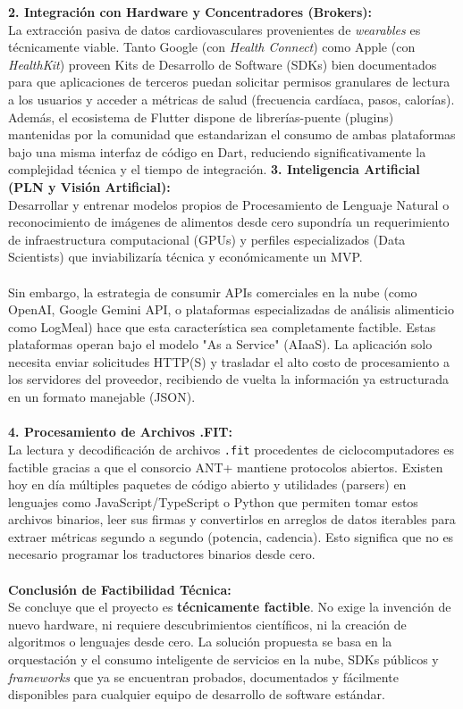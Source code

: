 \documentclass[12pt]{article}
\begin{document}
\textbf{2. Integración con Hardware y Concentradores (Brokers):}\\
La extracción pasiva de datos cardiovasculares provenientes de \textit{wearables} es técnicamente viable. Tanto Google (con \textit{Health Connect}) como Apple (con \textit{HealthKit}) proveen Kits de Desarrollo de Software (SDKs) bien documentados para que aplicaciones de terceros puedan solicitar permisos granulares de lectura a los usuarios y acceder a métricas de salud (frecuencia cardíaca, pasos, calorías). Además, el ecosistema de Flutter dispone de librerías-puente (plugins) mantenidas por la comunidad que estandarizan el consumo de ambas plataformas bajo una misma interfaz de código en Dart, reduciendo significativamente la complejidad técnica y el tiempo de integración.
\newpage
\textbf{3. Inteligencia Artificial (PLN y Visión Artificial):}\\
Desarrollar y entrenar modelos propios de Procesamiento de Lenguaje Natural o reconocimiento de imágenes de alimentos desde cero supondría un requerimiento de infraestructura computacional (GPUs) y perfiles especializados (Data Scientists) que inviabilizaría técnica y económicamente un MVP. 
\\\\
Sin embargo, la estrategia de consumir APIs comerciales en la nube (como OpenAI, Google Gemini API, o plataformas especializadas de análisis alimenticio como LogMeal) hace que esta característica sea completamente factible. Estas plataformas operan bajo el modelo "As a Service" (AIaaS). La aplicación solo necesita enviar solicitudes HTTP(S) y trasladar el alto costo de procesamiento a los servidores del proveedor, recibiendo de vuelta la información ya estructurada en un formato manejable (JSON).
\\\\
\textbf{4. Procesamiento de Archivos .FIT:}\\
La lectura y decodificación de archivos \texttt{.fit} procedentes de ciclocomputadores es factible gracias a que el consorcio ANT+ mantiene protocolos abiertos. Existen hoy en día múltiples paquetes de código abierto y utilidades (parsers) en lenguajes como JavaScript/TypeScript o Python que permiten tomar estos archivos binarios, leer sus firmas y convertirlos en arreglos de datos iterables para extraer métricas segundo a segundo (potencia, cadencia). Esto significa que no es necesario programar los traductores binarios desde cero.
\\\\
\textbf{Conclusión de Factibilidad Técnica:}\\
Se concluye que el proyecto es \textbf{técnicamente factible}. No exige la invención de nuevo hardware, ni requiere descubrimientos científicos, ni la creación de algoritmos o lenguajes desde cero. La solución propuesta se basa en la orquestación y el consumo inteligente de servicios en la nube, SDKs públicos y \textit{frameworks} que ya se encuentran probados, documentados y fácilmente disponibles para cualquier equipo de desarrollo de software estándar.
\newpage
\end{document}

